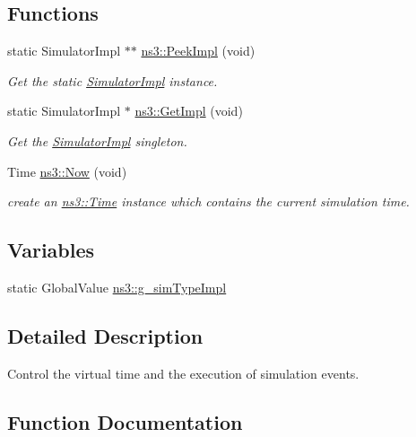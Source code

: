 \subsection*{Functions}
\begin{DoxyCompactItemize}
\item 
static Simulator\+Impl $\ast$$\ast$ \hyperlink{group__simulator_ga233c5c38de117e4e4a5a9cd168694792}{ns3\+::\+Peek\+Impl} (void)
\begin{DoxyCompactList}\small\item\em Get the static \hyperlink{classns3_1_1SimulatorImpl}{Simulator\+Impl} instance. \end{DoxyCompactList}\item 
static Simulator\+Impl $\ast$ \hyperlink{group__simulator_ga42eb4eddad41528d4d99794a3dae3fd0}{ns3\+::\+Get\+Impl} (void)
\begin{DoxyCompactList}\small\item\em Get the \hyperlink{classns3_1_1SimulatorImpl}{Simulator\+Impl} singleton. \end{DoxyCompactList}\item 
Time \hyperlink{group__simulator_gac3635e2e87f7ce316c89290ee1b01d0d}{ns3\+::\+Now} (void)
\begin{DoxyCompactList}\small\item\em create an \hyperlink{classns3_1_1Time}{ns3\+::\+Time} instance which contains the current simulation time. \end{DoxyCompactList}\end{DoxyCompactItemize}
\subsection*{Variables}
\begin{DoxyCompactItemize}
\item 
static Global\+Value \hyperlink{group__simulator_ga590f49e0f2b8bb103fb0415beae2245a}{ns3\+::g\+\_\+sim\+Type\+Impl}
\end{DoxyCompactItemize}


\subsection{Detailed Description}
Control the virtual time and the execution of simulation events. 



\subsection{Function Documentation}
